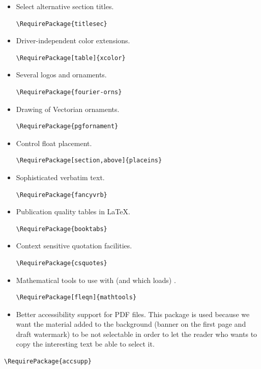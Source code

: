 \documentclass{letgut}
\begin{document}
\begin{itemize}
\begin{lstlisting}
\RequirePackage{enumitem}
\end{lstlisting}
\item Select alternative section titles.
\begin{lstlisting}
\RequirePackage{titlesec}
\end{lstlisting}
\item Driver-independent color extensions.
\begin{lstlisting}
\RequirePackage[table]{xcolor}
\end{lstlisting}
\item Several logos and ornaments.
\begin{lstlisting}
\RequirePackage{fourier-orns}
\end{lstlisting}
\item Drawing of Vectorian ornaments.
\begin{lstlisting}
\RequirePackage{pgfornament}
\end{lstlisting}
\item Control float placement.
\begin{lstlisting}
\RequirePackage[section,above]{placeins}
\end{lstlisting}
\item Sophisticated verbatim text.
\begin{lstlisting}
\RequirePackage{fancyvrb}
\end{lstlisting}
\item Publication quality tables in \LaTeX{}.
\begin{lstlisting}
\RequirePackage{booktabs}
\end{lstlisting}
\item Context sensitive quotation facilities.
\begin{lstlisting}
\RequirePackage{csquotes}
\end{lstlisting}
\item Mathematical tools to use with (and which loads) .
\begin{lstlisting}
\RequirePackage[fleqn]{mathtools}
\end{lstlisting}
\item Better accessibility support for PDF files. This package is used because we
want the material added to the background (banner on the first page and draft
watermark) to be not selectable in order to let the reader who wants to copy
the interesting text be able to select it.
\end{itemize}
\begin{lstlisting}
\RequirePackage{accsupp}
\end{lstlisting}
\end{document}
